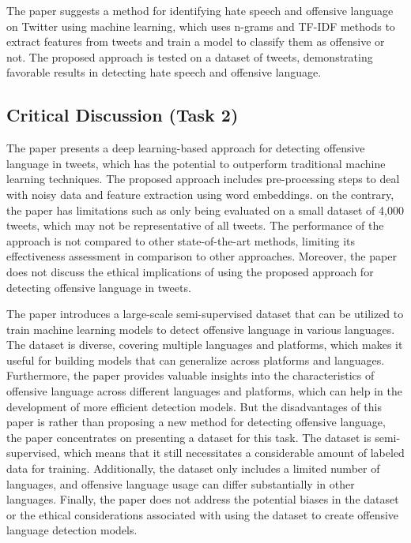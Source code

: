 \documentclass[11pt,a4paper]{article}
\begin{document}
The paper \cite{10} suggests a method for identifying hate speech and offensive language on Twitter using machine learning, which uses n-grams and TF-IDF methods to extract features from tweets and train a model to classify them as offensive or not. The proposed approach is tested on a dataset of tweets, demonstrating favorable results in detecting hate speech and offensive language.

\subsection{Critical Discussion (Task 2)}
The paper \cite{6} presents a deep learning-based approach for detecting offensive language in tweets, which has the potential to outperform traditional machine learning techniques. The proposed approach includes pre-processing steps to deal with noisy data and feature extraction using word embeddings. on the contrary, the paper has limitations such as only being evaluated on a small dataset of 4,000 tweets, which may not be representative of all tweets. The performance of the approach is not compared to other state-of-the-art methods, limiting its effectiveness assessment in comparison to other approaches. Moreover, the paper does not discuss the ethical implications of using the proposed approach for detecting offensive language in tweets.

The paper \cite{7} introduces a large-scale semi-supervised dataset that can be utilized to train machine learning models to detect offensive language in various languages. The dataset is diverse, covering multiple languages and platforms, which makes it useful for building models that can generalize across platforms and languages. Furthermore, the paper provides valuable insights into the characteristics of offensive language across different languages and platforms, which can help in the development of more efficient detection models.
But the disadvantages of this paper is rather than proposing a new method for detecting offensive language, the paper concentrates on presenting a dataset for this task. The dataset is semi-supervised, which means that it still necessitates a considerable amount of labeled data for training. Additionally, the dataset only includes a limited number of languages, and offensive language usage can differ substantially in other languages. Finally, the paper does not address the potential biases in the dataset or the ethical considerations associated with using the dataset to create offensive language detection models.
\end{document}
